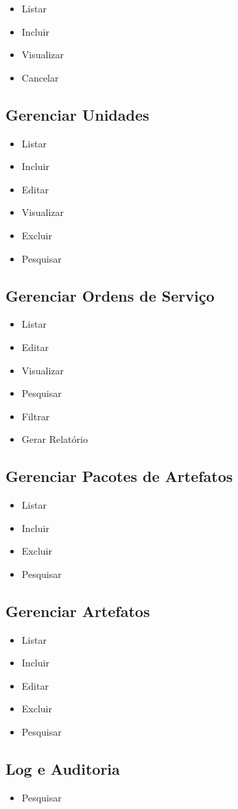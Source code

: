 \begin{itemize}
	\item 	Listar
	\item 	Incluir
	\item 	Visualizar
	\item 	Cancelar
\end{itemize}

\subsection{Gerenciar Unidades}

\begin{itemize}
	\item 	Listar
	\item 	Incluir
	\item 	Editar
	\item 	Visualizar
	\item 	Excluir
	\item 	Pesquisar
\end{itemize}

\subsection{Gerenciar Ordens de Serviço}

\begin{itemize}
	\item 	Listar
	\item 	Editar
	\item 	Visualizar
	\item 	Pesquisar
	\item 	Filtrar
	\item 	Gerar Relatório
\end{itemize}

\subsection{Gerenciar Pacotes de Artefatos}

\begin{itemize}
	\item 	Listar
	\item 	Incluir
	\item 	Excluir
	\item 	Pesquisar
\end{itemize}

\subsection{Gerenciar Artefatos}

\begin{itemize}
	\item 	Listar
	\item 	Incluir
	\item 	Editar
	\item 	Excluir
	\item 	Pesquisar
\end{itemize}

\subsection{Log e Auditoria}

\begin{itemize}
	\item Pesquisar
\end{itemize}
